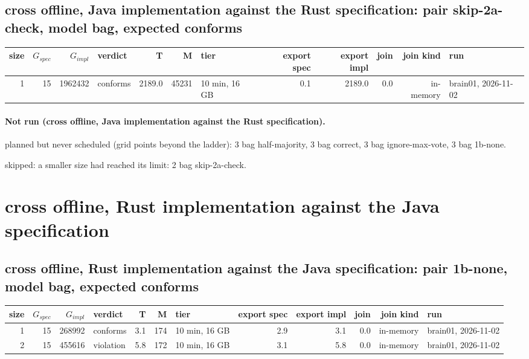 \documentclass[10pt]{article}
\begin{document}
\subsection*{cross offline, Java implementation against the Rust specification: pair \textsf{skip-2a-check}, model bag, expected conforms}
\begin{longtable}{@{}rrrlrrlrrrrl@{}}
\toprule
size & $G_{\mathit{spec}}$ & $G_{\mathit{impl}}$ & verdict & T & M & tier & export spec & export impl & join & join kind & run \\
\midrule
\endhead
\color{red} 1 & 15 & 1962432 & conforms & 2189.0 & 45231 & 10 min, 16 GB & 0.1 & 2189.0 & 0.0 & in-memory & brain01, 2026-11-02 \\
\bottomrule
\end{longtable}
\paragraph{Not run (cross offline, Java implementation against the Rust specification).}
planned but never scheduled (grid points beyond the ladder): 3 bag half-majority, 3 bag correct, 3 bag ignore-max-vote, 3 bag 1b-none.\par
skipped: a smaller size had reached its limit: 2 bag skip-2a-check.\par
\section*{cross offline, Rust implementation against the Java specification}
\subsection*{cross offline, Rust implementation against the Java specification: pair \textsf{1b-none}, model bag, expected conforms}
\begin{longtable}{@{}rrrlrrlrrrrl@{}}
\toprule
size & $G_{\mathit{spec}}$ & $G_{\mathit{impl}}$ & verdict & T & M & tier & export spec & export impl & join & join kind & run \\
\midrule
\endhead
\color{red} 1 & 15 & 268992 & conforms & 3.1 & 174 & 10 min, 16 GB & 2.9 & 3.1 & 0.0 & in-memory & brain01, 2026-11-02 \\
\color{red} 2 & 15 & 455616 & violation & 5.8 & 172 & 10 min, 16 GB & 3.1 & 5.8 & 0.0 & in-memory & brain01, 2026-11-02 \\
\bottomrule
\end{longtable}
\end{document}
